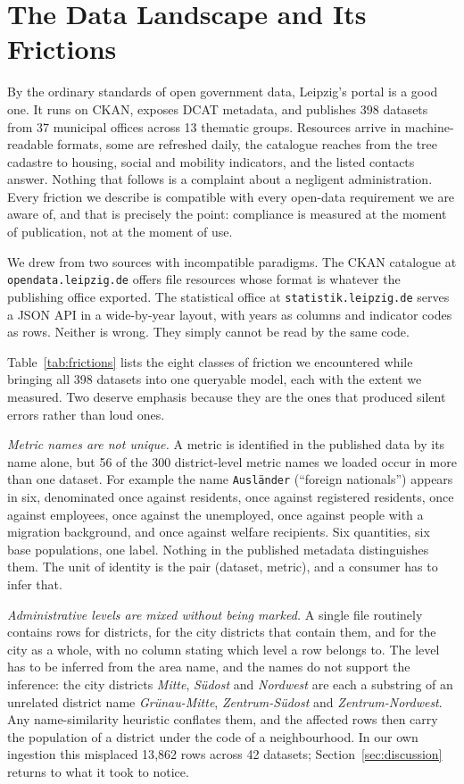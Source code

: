 \documentclass[conference,a4paper]{IEEEtran}
\begin{document}
\section{The Data Landscape and Its Frictions}
\label{sec:frictions}

By the ordinary standards of open government data, Leipzig's portal is a good
one. It runs on CKAN, exposes DCAT metadata, and publishes 398 datasets from 37
municipal offices across 13 thematic groups. Resources arrive in machine-readable
formats, some are refreshed daily, the catalogue reaches from the tree cadastre
to housing, social and mobility indicators, and the listed contacts answer.
Nothing that follows is a
complaint about a negligent administration. Every friction we describe is
compatible with every open-data requirement we are aware of, and that is
precisely the point: compliance is measured at the moment of publication, not at
the moment of use.

We drew from two sources with incompatible paradigms. The CKAN catalogue at
\texttt{opendata.leipzig.de} offers file resources whose format is whatever the
publishing office exported. The statistical office at
\texttt{statistik.leipzig.de} serves a JSON API in a wide-by-year layout, with
years as columns and indicator codes as rows. Neither is wrong. They simply
cannot be read by the same code.

Table~\ref{tab:frictions} lists the eight classes of friction we encountered
while bringing all 398 datasets into one queryable model, each with the extent we
measured. Two deserve emphasis because they are the ones that produced silent
errors rather than loud ones.

\emph{Metric names are not unique.} A metric is identified in the published data
by its name alone, but 56 of the 300 district-level metric names we loaded occur
in more than one dataset. For example the name \texttt{Ausländer} (``foreign nationals'')
appears in six, denominated once against residents, once against registered
residents, once against employees, once against the unemployed, once against
people with a migration background, and once against welfare recipients. Six
quantities, six base populations, one label. Nothing in the published metadata
distinguishes them. The unit of identity is the pair (dataset, metric), and a
consumer has to infer that.

\emph{Administrative levels are mixed without being marked.} A single file
routinely contains rows for districts, for the city districts that contain them,
and for the city as a whole, with no column stating which level a row belongs to.
The level has to be inferred from the area name, and the names do not support the
inference: the city districts \emph{Mitte}, \emph{Südost} and \emph{Nordwest} are
each a substring of an unrelated district name \emph{Grünau-Mitte},
\emph{Zentrum-Südost} and \emph{Zentrum-Nordwest}. Any name-similarity heuristic
conflates them, and the affected rows then carry the population of a district
under the code of a neighbourhood. In our own ingestion this misplaced 13{,}862
rows across 42 datasets; Section~\ref{sec:discussion} returns to what it took to
notice.
\end{document}
